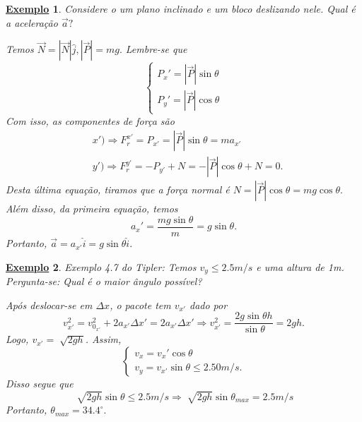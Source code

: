 \documentclass{article}
\newtheorem{example}{\underline{Exemplo}}
\begin{document}
  \begin{example}
    Considere o um plano inclinado e um bloco deslizando nele. Qual \'e a acelera\c c\~ao $\vec{a}?$
   \begin{center}
    \end{center}
    Temos $\vec{N} = |\vec{N}|\hat{j}, |\vec{P}|=mg.$ Lembre-se que 
      $$
        \left\{\begin{array}{ll}
            P_{x}' = |\vec{P}|\sin{\theta}\\
            P_{y}' = |\vec{P}|\cos{\theta}
          \end{array}\right.
      $$
      Com isso, as componentes de for\c ca s\~ao  
     \begin{align*}
       &x') \Rightarrow F_{r}^{x'} = P_{x'} = |\vec{P}|\sin{\theta} = ma_{x'}\\
       &y') \Rightarrow F_{r}^{y'} = -P_{y'} + N = -|\vec{P}|\cos{\theta} + N = 0.
     \end{align*}
     Desta \'ultima equa\c c\~ao, tiramos que a for\c ca normal \'e $N = |\vec{P}|\cos{\theta} = mg\cos{\theta}.$ Al\'em disso,
     da primeira equa\c c\~ao, temos 
       $$
         a_{x}' = \frac{mg\sin{\theta}}{m} = g\sin{\theta}.
       $$
       Portanto, $\vec{a} = a_{x'}\hat{i} = g\sin{\theta}\hat{i}.$
  \end{example}
  \begin{example}
    Exemplo 4.7 do Tipler: Temos $v_{y}\leq 2.5m/s$ e uma altura de 1m. Pergunta-se: Qual \'e o maior \^angulo poss\'ivel?

    Ap\'os deslocar-se em $\Delta x$, o pacote tem $v_{x'}$ dado por 
      $$
      v_{x'}^{2} = v_{0_{x'}}^{2} + 2 a_{x'}\Delta x' = 2a_{x'}\Delta x' \Rightarrow v_{x'}^{2} = \frac{2g\sin{\theta}h}{\sin{\theta}} = 2gh.
      $$
      Logo, $v_{x'} = \sqrt[]{2gh}$. Assim, 
        $$
          \left\{\begin{array}{ll}
              v_{x} = v_{x}'\cos{\theta}\\
              v_{y} = v_{x'}\sin{\theta}\leq 2.50m/s.
            \end{array}\right.
        $$
        Disso segue que 
          $$
          \sqrt[]{2gh}\sin{\theta}\leq 2.5m/s \Rightarrow \sqrt[]{2gh}\sin{\theta_{max}} = 2.5m/s
          $$
        Portanto, $\theta_{max} = 34.4^{\circ}.$
  \end{example}
\newpage
\end{document}
